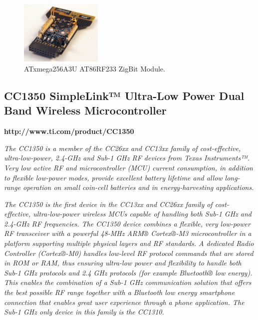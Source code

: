 \begin{figure}[h!]
	\centering
	\includegraphics[width=0.35\textwidth,keepaspectratio]{figures/atxmega}
	\caption{ATxmega256A3U AT86RF233 ZigBit Module.}
	
\end{figure}


\subsection{CC1350 SimpleLink™ Ultra-Low Power Dual Band Wireless Microcontroller}

\begin{mdframed}[	linecolor=black, outerlinewidth=5pt]
	\textbf{http://www.ti.com/product/CC1350}
	
	\small
	\textit{The CC1350 is a member of the CC26xx and CC13xx family of cost-effective, ultra-low-power, 2.4-GHz and Sub-1 GHz RF devices from Texas Instruments™. Very low active RF and microcontroller (MCU) current consumption, in addition to flexible low-power modes, provide excellent battery lifetime and allow long-range operation on small coin-cell batteries and in energy-harvesting applications.}
	
	\textit{The CC1350 is the first device in the CC13xx and CC26xx family of cost-effective, ultra-low-power wireless MCUs capable of handling both Sub-1 GHz and 2.4-GHz RF frequencies. The CC1350 device combines a flexible, very low-power RF transceiver with a powerful 48-MHz ARM® Cortex®-M3 microcontroller in a platform supporting multiple physical layers and RF standards. A dedicated Radio Controller (Cortex®-M0) handles low-level RF protocol commands that are stored in ROM or RAM, thus ensuring ultra-low power and flexibility to handle both Sub-1 GHz protocols and 2.4 GHz protocols (for example Bluetooth® low energy). This enables the combination of a Sub-1 GHz communication solution that offers the best possible RF range together with a Bluetooth low energy smartphone connection that enables great user experience through a phone application. The Sub-1 GHz only device in this family is the CC1310.}	
\end{mdframed}


